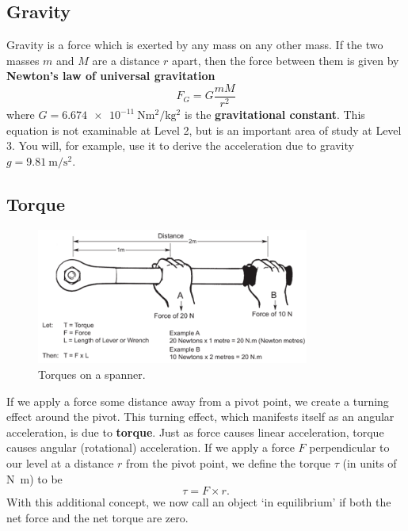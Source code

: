 \documentclass[a4paper]{amsbook}
\newcommand\capcite[1]{}
\begin{document}
\subsection{Gravity}
Gravity is a force which is exerted by any mass on any other mass. If the two masses $ m $ and $ M $ are a distance $ r $ apart,
then the force between them is given by \textbf{Newton's law of universal gravitation}
\begin{equation}
  F_G = G \frac{mM}{r^2}
\end{equation}
where $ G = \SI{6.674e-11}{\newton\metre\squared\per\kilo\gram\squared} $ is the \textbf{gravitational constant}. This equation
is not examinable at Level 2, but is an important area of study at Level 3. You will, for example, use it to derive the acceleration
due to gravity $ g = \SI{9.81}{\metre\per\second\squared} $.

\subsection{Torque}
\begin{figure}
  \centering
  \includegraphics[width=0.8\textwidth]{torque}
  \caption{Torques on a spanner. \capcite{http://www.gedore-torque.com/default/assets//Image/torque-calculation.gif}\label{fig:torque}}
\end{figure}
If we apply a force some distance away from a pivot point, we create a turning effect around the pivot. This turning
effect, which manifests itself as an angular acceleration, is due to \textbf{torque}. Just as force causes linear
acceleration, torque causes angular (rotational) acceleration. If we apply a force $ F $ perpendicular to our level
at a distance $ r $ from the pivot point, we define the torque $ \tau $ (in units of \si{\newton\metre}) to be
\begin{equation}
  \tau = F \times r.
\end{equation}
With this additional concept, we now call an object `in equilibrium' if both the net force and the net torque are zero.
\end{document}

